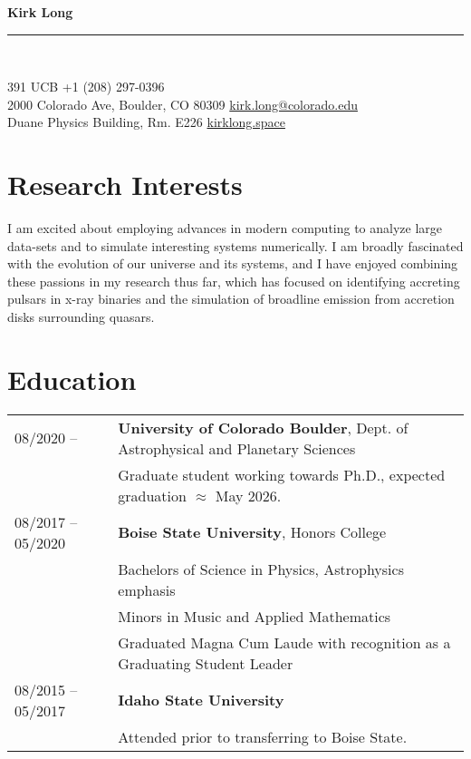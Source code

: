 \documentclass[11pt]{article}
\newcommand{\makeheading}[2]%
        {\begin{minipage}[t]{\textwidth}%
                 {\LARGE \bfseries #1} \\[-0.3\baselineskip]%
                 \rule{\columnwidth}{1.5pt}\\[0.1\baselineskip]
         \end{minipage}}
\begin{document}
\makeheading{Kirk Long}{}

391 UCB				\hfill	+1 (208) 297-0396\\
2000 Colorado Ave, Boulder, CO 80309	\hfill	\href{mailto:kirk.long@colorado.edu}{kirk.long@colorado.edu}\\
Duane Physics Building, Rm. E226			\hfill	\href{https://www.kirklong.space}{kirklong.space}



\section{Research Interests}
 I am excited about employing advances in modern computing to analyze large data-sets and to simulate interesting systems numerically. I am broadly fascinated with the evolution of our universe and its systems, and I have enjoyed combining these passions in my research thus far, which has focused on identifying accreting pulsars in x-ray binaries and the simulation of broadline emission from accretion disks surrounding quasars.

\section{Education}
\begin{tabular}{ll}
08/2020 -- & \textbf{University of Colorado Boulder}, Dept. of Astrophysical and Planetary Sciences \\
          & Graduate student working towards Ph.D., expected graduation $\approx$ May 2026. \vspace{1mm}\\
08/2017 -- 05/2020	& 	\textbf{Boise State University}, Honors College \\
			&	Bachelors of Science in Physics, Astrophysics emphasis\\
			&	Minors in Music and Applied Mathematics \\
			&	Graduated Magna Cum Laude with recognition as a Graduating Student Leader \vspace{1mm}\\
08/2015 -- 05/2017 & \textbf{Idaho State University} \\
      & Attended prior to transferring to Boise State. \\

\end{tabular}
\end{document}
